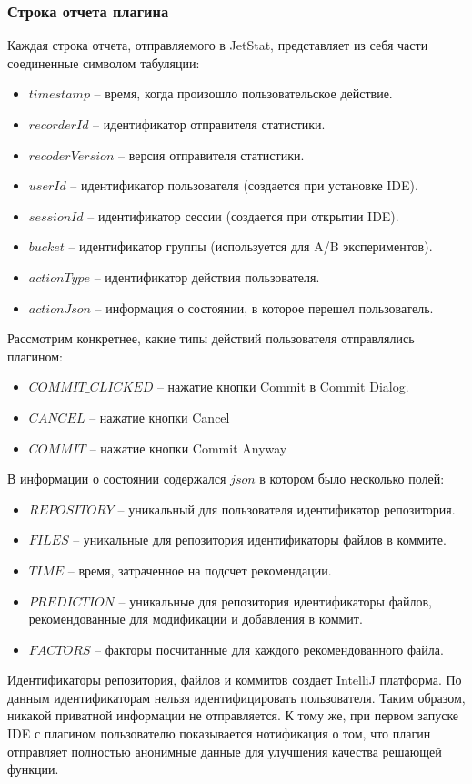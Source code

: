 \documentclass[times]{itmo-student-thesis}
\begin{document}
\subsubsection{Строка отчета плагина}\label{report-line}
Каждая строка отчета, отправляемого в JetStat, представляет из себя части соединенные символом табуляции:
    \begin{itemize}[label={\textbullet}]
        \item $timestamp$ -- время, когда произошло пользовательское действие.
        \item $recorderId$ -- идентификатор отправителя статистики.
        \item $recoderVersion$ -- версия отправителя статистики.
        \item $userId$ -- идентификатор пользователя (создается при установке IDE).
        \item $sessionId$ -- идентификатор сессии (создается при открытии IDE).
        \item $bucket$ -- идентификатор группы (используется для A/B экспериментов).
        \item $actionType$ -- идентификатор действия пользователя.
        \item $actionJson$ -- информация о состоянии, в которое перешел пользователь.
    \end{itemize}

Рассмотрим конкретнее, какие типы действий пользователя отправлялись плагином:
    \begin{itemize}[label={\textbullet}]
        \item $COMMIT\_CLICKED$ -- нажатие кнопки Commit в Commit Dialog.
        \item $CANCEL$ -- нажатие кнопки Cancel
        \item $COMMIT$ -- нажатие кнопки Commit Anyway
    \end{itemize}

В информации о состоянии содержался $json$ в котором было несколько полей:
    \begin{itemize}[label={\textbullet}]
        \item $REPOSITORY$ -- уникальный для пользователя идентификатор репозитория.
        \item $FILES$ -- уникальные для репозитория идентификаторы файлов в коммите.
        \item $TIME$ -- время, затраченное на подсчет рекомендации.
        \item $PREDICTION$ -- уникальные для репозитория идентификаторы файлов, рекомендованные для модификации и добавления в коммит.
        \item $FACTORS$ -- факторы посчитанные для каждого рекомендованного файла.
    \end{itemize}
Идентификаторы репозитория, файлов и коммитов создает IntelliJ платформа. По данным идентификаторам нельзя идентифицировать пользователя. Таким образом, никакой приватной информации не отправляется. К тому же, при первом запуске IDE с плагином пользователю показывается нотификация о том, что плагин отправляет полностью анонимные данные для улучшения качества решающей функции.
\end{document}
